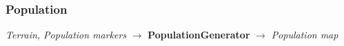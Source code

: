 \subsubsection{Population}
\begin{center}
    \textit{Terrain, Population markers} $\rightarrow$ \textbf{PopulationGenerator} $\rightarrow$ \textit{Population map} 
\end{center}